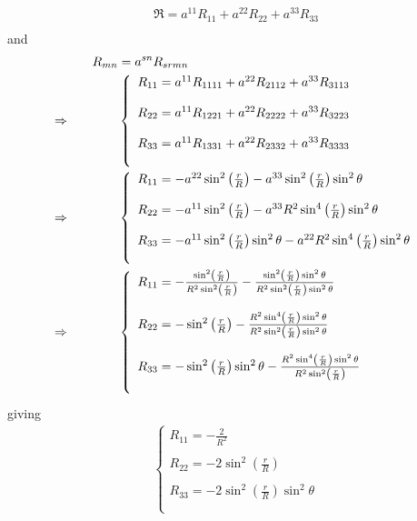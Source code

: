 \begin{align}
\mathfrak{R}=a^{11}R_{11}+a^{22}R_{22}+a^{33}R_{33}\\
\end{align}
and 
\begin{align}
R_{mn}&= a^{sn}R_{srmn}\\
\Rightarrow\quad\quad\quad\quad &
\left\{\begin{array}{l}
R_{11} = a^{11}R_{1111}+a^{22}R_{2112}+a^{33}R_{3113}\\\\
R_{22} = a^{11}R_{1221}+a^{22}R_{2222}+a^{33}R_{3223}\\\\
R_{33} = a^{11}R_{1331}+a^{22}R_{2332}+a^{33}R_{3333}\\\\
\end{array}\right.\\
\Rightarrow\quad\quad\quad\quad &\left\{\begin{array}{l}
R_{11} = -a^{22}\sin^2\left(\frac{r}{R}\right)-a^{33}\sin^2\left(\frac{r}{R}\right)\sin^2\theta\\\\
R_{22} = -a^{11}\sin^2\left(\frac{r}{R}\right)-a^{33}R^2\sin^4\left(\frac{r}{R}\right)\sin^2\theta\\\\
R_{33} = -a^{11}\sin^2\left(\frac{r}{R}\right)\sin^2\theta-a^{22}R^2\sin^4\left(\frac{r}{R}\right)\sin^2\theta\\\\
\end{array}\right.\\
\Rightarrow\quad\quad\quad\quad &\left\{\begin{array}{l}
R_{11} = -\frac{\sin^2\left(\frac{r}{R}\right)}{R^2\sin^2\left(\frac{r}{R}\right)}-\frac{\sin^2\left(\frac{r}{R}\right)\sin^2\theta}{R^2\sin^2\left(\frac{r}{R}\right)\sin^2\theta}\\\\
R_{22} = -\sin^2\left(\frac{r}{R}\right)-\frac{R^2\sin^4\left(\frac{r}{R}\right)\sin^2\theta}{R^2\sin^2\left(\frac{r}{R}\right)\sin^2\theta}\\\\
R_{33} = -\sin^2\left(\frac{r}{R}\right)\sin^2\theta-\frac{R^2\sin^4\left(\frac{r}{R}\right)\sin^2\theta}{R^2\sin^2\left(\frac{r}{R}\right)}\\\\
\end{array}\right.
\end{align}
giving
\begin{align}
\left\{\begin{array}{l}
R_{11} = -\frac{2}{R^2}\\\\
R_{22} = -2\sin^2\left(\frac{r}{R}\right)\\\\
R_{33} = -2\sin^2\left(\frac{r}{R}\right)\sin^2\theta\\\\
\end{array}\right.
\end{align}
